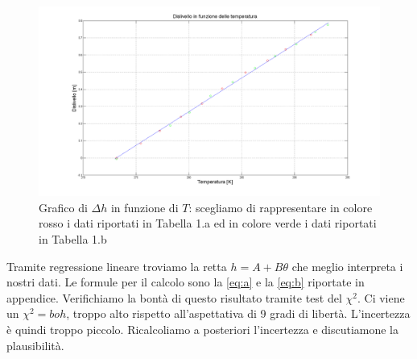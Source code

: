 \begin{figure}[H]
\centering
\includegraphics[width=\textwidth]{img/1}
\caption{Grafico di $\Delta h$ in funzione di $T$: scegliamo di rappresentare in colore rosso i dati riportati in Tabella 1.a ed in colore verde i dati riportati in Tabella 1.b}
\end{figure}

Tramite regressione lineare troviamo la retta $h = A+B\theta$ che meglio interpreta i nostri dati. 
Le formule per il calcolo sono la \eqref{eq:a} e la \eqref{eq:b} riportate in appendice.
Verifichiamo la bontà di questo risultato tramite test del $\chi^2$. Ci viene un $\chi^2=boh$, troppo alto rispetto all'aspettativa di 9 gradi di libertà.
L'incertezza è quindi troppo piccolo. 
Ricalcoliamo a posteriori l'incertezza e discutiamone la plausibilità.\\

